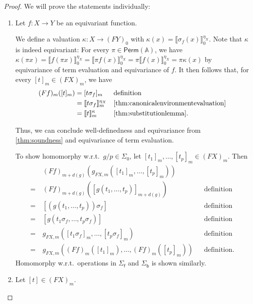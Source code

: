\documentclass[11pt,a4paper]{amsart}
\newcommand{\Perm}{\mathsf{Perm}(\Names)}
\newcommand{\sigp}{\Sigma_0}
\newcommand{\sigf}{\Sigma_{\mathsf f}}
\newcommand{\sigb}{\Sigma_{\mathsf b}}
\newcommand{\Names}{\mathbb{A}}
\theoremstyle{plain}
\numberwithin{equation}{section}
\newcommand{\+}[1]{\mathcal{#1}\xspace}
\theoremstyle{definition}
\begin{document}
\begin{proof}
    We will prove the statements individually:
    \begin{enumerate}[wide]
        \item \label{itm:freemodelfunctorequivariance}
            Let \(f: X \to Y\) be an equivariant function.

            We define a valuation \(\kappa: X \to (FY)_0\) with \(\kappa(x) = \llbracket \sigma_f(x) \rrbracket^{\eta_X}_0\).
            Note that \(\kappa\) is indeed equivariant:
            For every \(\pi \in \Perm\), we have \(\kappa(\pi x) = \llbracket f(\pi x) \rrbracket^{\eta_X}_0 = \llbracket \pi f(x) \rrbracket^{\eta_X}_0 = \pi\llbracket f(x) \rrbracket^{\eta_X}_0 = \pi\kappa(x)\) by equivariance of term evaluation and equivariance of \(f\).
            It then follows that, for every \([t]_m \in (FX)_m\), we have
            \begin{align*}
                (Ff)_m([t]_m)
                &= [t\sigma_f]_m && \text{definition} \\
                &= \llbracket t\sigma_f \rrbracket^{\eta_X}_m && \text{\cref{thm:canonicalenvironmentevaluation}} \\
                &= \llbracket t \rrbracket^\kappa_m && \text{\cref{thm:substitutionlemma}}.
            \end{align*}

            Thus, we can conclude well-definedness and equivariance from \cref{thm:soundness} and equivariance of term evaluation.

            To show homomorphy w.r.t.~\(g/p \in \sigp\), let \([t_1]_m, \ldots, [t_p]_m \in (FX)_m\).
            Then
            \begin{align*}
                &(Ff)_{m + d(g)}(g_{FX, m}([t_1]_m, \ldots, [t_p]_m)) \\
                =~&(Ff)_{m + d(g)}([g(t_1, \ldots, t_p)]_{m + d(g)}) && \text{definition} \\
                =~&[(g(t_1, \ldots, t_p))\sigma_f] && \text{definition} \\
                =~&[g(t_1\sigma_f, \ldots, t_p\sigma_f)] && \text{definition} \\
                =~&g_{FX, m}([t_1\sigma_f]_m, \ldots, [t_p\sigma_f]_m) && \text{definition} \\
                =~&g_{FX, m}((Ff)_m([t_1]_m), \ldots, (Ff)_m([t_p]_m)) && \text{definition}.
            \end{align*}
            Homomorphy w.r.t.\ operations in $\sigf$ and $\sigb$ is shown similarly.
        \item
            Let \([t] \in (FX)_m\).


\end{enumerate}
\end{proof}
\end{document}
